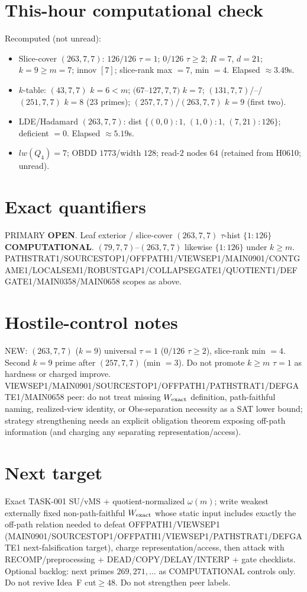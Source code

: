 \documentclass[11pt]{article}
\begin{document}
\section*{This-hour computational check}
Recomputed (not unread):
\begin{itemize}
\item Slice-cover $(263,7,7)$: $126/126$ $\tau{=}1$; $0/126$ $\tau{\ge}2$; $R{=}7$, $d{=}21$;
  $k{=}9{\ge}m{=}7$; innov $[7]$; slice-rank max $=7$, min $=4$. Elapsed $\approx3.49$s.
\item $k$-table: $(43,7,7)$ $k{=}6{<}m$; $(67$--$127,7,7)$ $k{=}7$;
  $(131,7,7)$/--/$(251,7,7)$ $k{=}8$ (23 primes); $(257,7,7)$/$(263,7,7)$ $k{=}9$ (first two).
\item LDE/Hadamard $(263,7,7)$: dist $\{(0,0){:}1,\,(1,0){:}1,\,(7,21){:}126\}$; deficient $=0$. Elapsed $\approx5.19$s.
\item $lw(Q_4)=7$; OBDD $1773$/width $128$; read-$2$ nodes $64$ (retained from H0610; unread).
\end{itemize}

\section*{Exact quantifiers}
PRIMARY \textbf{OPEN}. Leaf exterior / slice-cover $(263,7,7)$ $\tau$-hist $\{1{:}126\}$ \textbf{COMPUTATIONAL}.
$(79,7,7)$--$(263,7,7)$ likewise $\{1{:}126\}$ under $k{\ge}m$.
PATHSTRAT1/SOURCESTOP1/OFFPATH1/VIEWSEP1/MAIN0901/CONTGAME1/LOCALSEM1/ROBUSTGAP1/COLLAPSEGATE1/QUOTIENT1/DEFGATE1/MAIN0358/MAIN0658 scopes as above.

\section*{Hostile-control notes}
NEW: $(263,7,7)$ ($k{=}9$) universal $\tau{=}1$ ($0/126$ $\tau{\ge}2$), slice-rank min $=4$.
Second $k{=}9$ prime after $(257,7,7)$ (min $=3$).
Do not promote $k{\ge}m$ $\tau{=}1$ as hardness or charged improve.
VIEWSEP1/MAIN0901/SOURCESTOP1/OFFPATH1/PATHSTRAT1/DEFGATE1/MAIN0658 peer: do not treat missing $W_{\rm exact}$ definition,
path-faithful naming, realized-view identity, or Obs-separation necessity as a SAT lower bound;
strategy strengthening needs an explicit obligation theorem exposing off-path information
(and charging any separating representation/access).

\section*{Next target}
Exact TASK-001 SU/vMS + quotient-normalized $\omega(m)$; write weakest externally fixed non-path-faithful
$W_{\rm exact}$ whose static input includes exactly the off-path relation needed to defeat OFFPATH1/VIEWSEP1
(MAIN0901/SOURCESTOP1/OFFPATH1/VIEWSEP1/PATHSTRAT1/DEFGATE1 next-falsification target), charge representation/access,
then attack with RECOMP/preprocessing + DEAD/COPY/DELAY/INTERP + gate checklists.
Optional backlog: next primes $269,271,\ldots$ as COMPUTATIONAL controls only.
Do not revive Idea~F cut$\ge48$. Do not strengthen peer labels.
\end{document}
